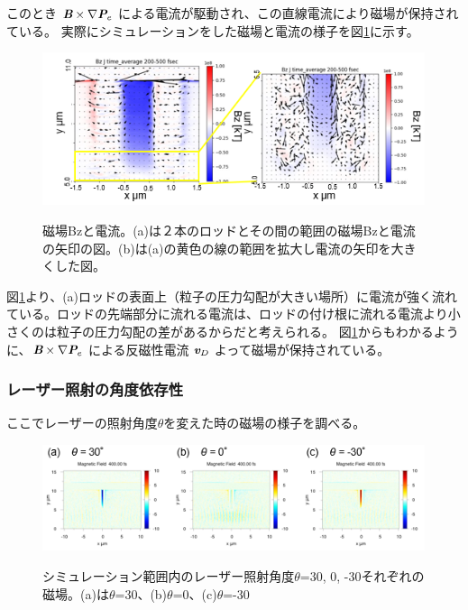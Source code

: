 \documentclass[a4paper,11pt,titlepage]{jarticle}
\numberwithin{equation}{section} %
\begin{document}
  このとき $\textit{\textbf{B}} \times \nabla \textit{\textbf{P}}_e$ による電流が駆動され、この直線電流により磁場が保持されている。
  実際にシミュレーションをした磁場と電流の様子を図\ref{fig:4-2-7}に示す。
  
  \begin{figure}[H]
    \begin{center}
      \includegraphics[scale=0.5]{./image/4-17-2rod.png}
      \label{fig:4-2-7}
      \caption{磁場Bzと電流。(a)は２本のロッドとその間の範囲の磁場Bzと電流の矢印の図。(b)は(a)の黄色の線の範囲を拡大し電流の矢印を大きくした図。}
    \end{center}
  \end{figure}
  
  図\ref{fig:4-2-7}より、(a)ロッドの表面上（粒子の圧力勾配が大きい場所）に電流が強く流れている。ロッドの先端部分に流れる電流は、ロッドの付け根に流れる電流より小さくのは粒子の圧力勾配の差があるからだと考えられる。
  図\ref{fig:4-2-7}からもわかるように、$\textit{\textbf{B}} \times \nabla \textit{\textbf{P}}_e$ による反磁性電流 $\textit{\textbf{v}}_D$ よって磁場が保持されている。


  \subsubsection{レーザー照射の角度依存性}
  ここでレーザーの照射角度$ \theta $を変えた時の磁場の様子を調べる。
  
  \begin{figure}[H]
    \begin{center}
      \includegraphics[scale=0.6]{./image/4-19-2rod.png}
      \label{fig:4-4-3}
      \caption{シミュレーション範囲内のレーザー照射角度$\theta$=30, 0, -30それぞれの磁場。(a)は$\theta$=30、(b)$\theta$=0、(c)$\theta$=-30}
    \end{center}
  \end{figure}
  
\end{document}
